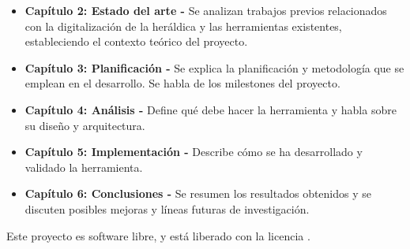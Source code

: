 \begin{itemize}
    \item \textbf{Capítulo 2: Estado del arte - }Se analizan trabajos previos relacionados
    con la digitalización de la heráldica y las herramientas existentes, estableciendo
    el contexto teórico del proyecto.
    \item \textbf{Capítulo 3: Planificación - }Se explica la planificación y metodología
    que se emplean en el desarrollo. Se habla de los milestones del proyecto.
    \item \textbf{Capítulo 4: Análisis - }Define qué debe hacer la herramienta y habla
    sobre su diseño y arquitectura.
    \item \textbf{Capítulo 5: Implementación - }Describe cómo se ha desarrollado y validado
    la herramienta. 
    \item \textbf{Capítulo 6: Conclusiones - }Se resumen los resultados obtenidos y se
    discuten posibles mejoras y líneas futuras de investigación.
\end{itemize}

Este proyecto es software libre, y está liberado con la licencia \cite{gplv3}.